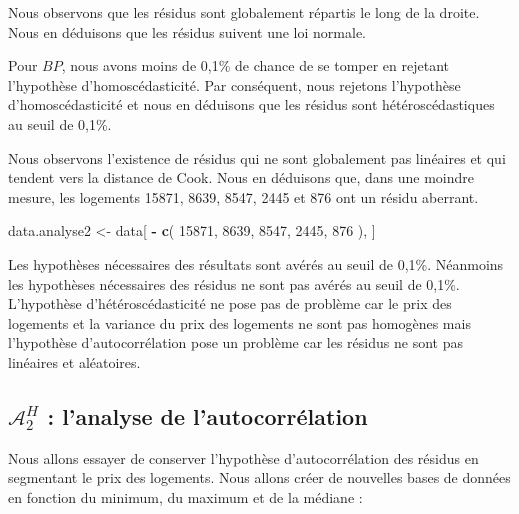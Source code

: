 \documentclass[
  11pt,
  french,
]{article}
\newenvironment{Shaded}{\begin{snugshade}}{\end{snugshade}}
\newcommand{\DecValTok}[1]{\textcolor[rgb]{0.00,0.00,0.81}{#1}}
\newcommand{\KeywordTok}[1]{\textcolor[rgb]{0.13,0.29,0.53}{\textbf{#1}}}
\newcommand{\NormalTok}[1]{#1}
\newcommand{\OperatorTok}[1]{\textcolor[rgb]{0.81,0.36,0.00}{\textbf{#1}}}
\newcommand{\StringTok}[1]{\textcolor[rgb]{0.31,0.60,0.02}{#1}}
\begin{document}
Nous observons que les résidus sont globalement répartis le long de la
droite. Nous en déduisons que les résidus suivent une loi normale.

Pour \(BP\), nous avons moins de 0,1\% de chance de se tomper en
rejetant l'hypothèse d'homoscédasticité. Par conséquent, nous rejetons
l'hypothèse d'homoscédasticité et nous en déduisons que les résidus sont
hétéroscédastiques au seuil de 0,1\%.

Nous observons l'existence de résidus qui ne sont globalement pas
linéaires et qui tendent vers la distance de Cook. Nous en déduisons
que, dans une moindre mesure, les logements 15871, 8639, 8547, 2445 et
876 ont un résidu aberrant.

\begin{Shaded}
\begin{Highlighting}[]
\NormalTok{data.analyse2 <-}\StringTok{ }\NormalTok{data[ }\OperatorTok{-}\StringTok{ }\KeywordTok{c}\NormalTok{( }\DecValTok{15871}\NormalTok{,}
                            \DecValTok{8639}\NormalTok{,}
                            \DecValTok{8547}\NormalTok{,}
                            \DecValTok{2445}\NormalTok{,}
                            \DecValTok{876}\NormalTok{ ), ]}
\end{Highlighting}
\end{Shaded}

Les hypothèses nécessaires des résultats sont avérés au seuil de 0,1\%.
Néanmoins les hypothèses nécessaires des résidus ne sont pas avérés au
seuil de 0,1\%. L'hypothèse d'hétéroscédasticité ne pose pas de problème
car le prix des logements et la variance du prix des logements ne sont
pas homogènes mais l'hypothèse d'autocorrélation pose un problème car
les résidus ne sont pas linéaires et aléatoires.

\newpage

\hypertarget{mathcala_2h-lanalyse-de-lautocorruxe9lation}{%
\subsection{\texorpdfstring{\(\mathcal{A}_{2}^{H}\) : l'analyse de
l'autocorrélation}{\textbackslash mathcal\{A\}\_\{2\}\^{}\{H\} : l'analyse de l'autocorrélation}}\label{mathcala_2h-lanalyse-de-lautocorruxe9lation}}

Nous allons essayer de conserver l'hypothèse d'autocorrélation des
résidus en segmentant le prix des logements. Nous allons créer de
nouvelles bases de données en fonction du minimum, du maximum et de la
médiane :
\end{document}
